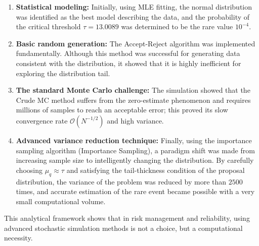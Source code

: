 \documentclass[12pt,a4paper]{article}
\begin{document}
	\begin{enumerate}
		\item \textbf{Statistical modeling:} Initially, using MLE fitting, the normal distribution was identified as the best model describing the data, and the probability of the critical threshold $\tau = 13.0089$ was determined to be the rare value $10^{-4}$.
		\item \textbf{Basic random generation:} The Accept-Reject algorithm was implemented fundamentally. Although this method was successful for generating data consistent with the distribution, it showed that it is highly inefficient for exploring the distribution tail.
		\item \textbf{The standard Monte Carlo challenge:} The simulation showed that the Crude MC method suffers from the zero-estimate phenomenon and requires millions of samples to reach an acceptable error; this proved its slow convergence rate $\mathcal{O}(N^{-1/2})$ and high variance.
		\item \textbf{Advanced variance reduction technique:} Finally, using the importance sampling algorithm (Importance Sampling), a paradigm shift was made from increasing sample size to intelligently changing the distribution. By carefully choosing $\mu_q \approx \tau$ and satisfying the tail-thickness condition of the proposal distribution, the variance of the problem was reduced by more than $2500$ times, and accurate estimation of the rare event became possible with a very small computational volume.
	\end{enumerate}
	
	This analytical framework shows that in risk management and reliability, using advanced stochastic simulation methods is not a choice, but a computational necessity.
	
\end{document}
